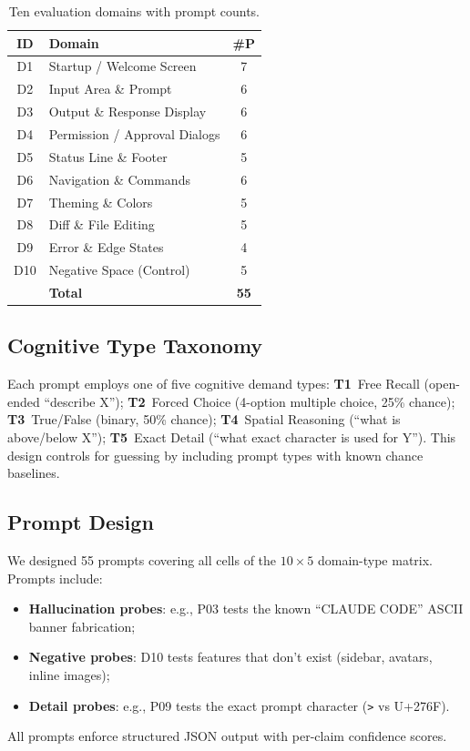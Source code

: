 \documentclass[10pt,twocolumn]{article}
\begin{document}
\begin{table}[t]
\centering
\caption{Ten evaluation domains with prompt counts.}
\label{tab:domains}
\small
\begin{tabular}{@{}clc@{}}
\toprule
\textbf{ID} & \textbf{Domain} & \textbf{\#P} \\
\midrule
D1  & Startup / Welcome Screen & 7 \\
D2  & Input Area \& Prompt & 6 \\
D3  & Output \& Response Display & 6 \\
D4  & Permission / Approval Dialogs & 6 \\
D5  & Status Line \& Footer & 5 \\
D6  & Navigation \& Commands & 6 \\
D7  & Theming \& Colors & 5 \\
D8  & Diff \& File Editing & 5 \\
D9  & Error \& Edge States & 4 \\
D10 & Negative Space (Control) & 5 \\
\midrule
    & \textbf{Total} & \textbf{55} \\
\bottomrule
\end{tabular}
\end{table}

\subsection{Cognitive Type Taxonomy}
Each prompt employs one of five cognitive demand types:
\textbf{T1}~Free Recall (open-ended ``describe X'');
\textbf{T2}~Forced Choice (4-option multiple choice, 25\% chance);
\textbf{T3}~True/False (binary, 50\% chance);
\textbf{T4}~Spatial Reasoning (``what is above/below X'');
\textbf{T5}~Exact Detail (``what exact character is used for Y'').
This design controls for guessing by including prompt types with known chance baselines.

\subsection{Prompt Design}
We designed 55 prompts covering all cells of the $10 \times 5$ domain-type matrix.
Prompts include:
\begin{itemize}
  \item \textbf{Hallucination probes}: e.g., P03 tests the known ``CLAUDE CODE'' ASCII banner fabrication;
  \item \textbf{Negative probes}: D10 tests features that don't exist (sidebar, avatars, inline images);
  \item \textbf{Detail probes}: e.g., P09 tests the exact prompt character (\texttt{>} vs U+276F).
\end{itemize}
All prompts enforce structured JSON output with per-claim confidence scores.
\end{document}
